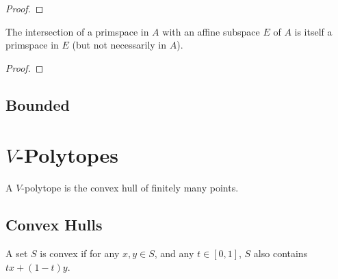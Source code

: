 \begin{proof}
\end{proof}

\begin{lemma}
    \label{lem:subspace_restriction_is_primspace}

    The intersection of a primspace in $A$ with an affine subspace $E$ of $A$ is itself a primspace in $E$ (but not necessarily in $A$).

    \leanok
\end{lemma}

\begin{proof}
    \leanok
\end{proof}

\subsection{Bounded}

\begin{definition}
    \label{def:bounded}
\end{definition}

\section{$V$-Polytopes}

\begin{definition}
    \label{def:v_polytope}
    A $V$-polytope is the convex hull of finitely many points.
\end{definition}

\begin{proposition}
    \label{prop:v_is_h}
\end{proposition}

\subsection{Convex Hulls}

\begin{definition}
    \label{def:is_convex}
    A set $S$ is convex if for any $x, y \in S$, and any $t \in [0,1]$, $S$ also contains $t x + (1-t) y$.
    \leanok
\end{definition}

